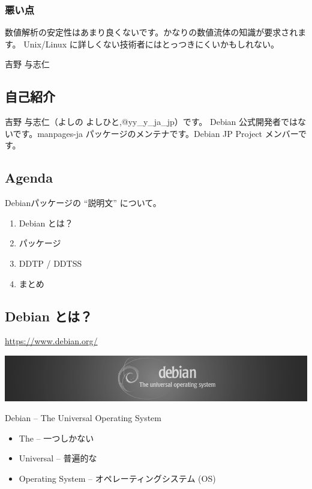 \documentclass[mingoth,a4paper]{jsarticle}
\begin{document}
\subsubsection{悪い点}
数値解析の安定性はあまり良くないです。かなりの数値流体の知識が要求されます。
Unix/Linux に詳しくない技術者にはとっつきにくいかもしれない。

 {吉野 与志仁}

\subsection{自己紹介}

吉野 与志仁（よしの よしひと,@yy\_y\_ja\_jp）です。
Debian 公式開発者ではないです。manpages-ja パッケージのメンテナです。Debian JP Project メンバーです。

\subsection{Agenda}
 Debianパッケージの “説明文” について。
\begin{enumerate}
   \item Debian とは？
   \item パッケージ
   \item DDTP / DDTSS
   \item まとめ
\end{enumerate}

\subsection{Debian とは？}


 \url{https://www.debian.org/}


 \begin{center}
  \includegraphics[width=\hsize]{image201606/banner_mono.png}
 \end{center}


 Debian -- The Universal Operating System
\begin{itemize}
 \item The  -- 一つしかない
 \item Universal  -- 普遍的な
 \item Operating System  -- オペレーティングシステム (OS)
\end{itemize}
\end{document}
